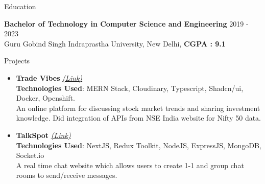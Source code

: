 \documentclass{resume} %
\begin{document}

\begin{rSection}{Education}

{\bf Bachelor of Technology in Computer Science and Engineering} \hfill {2019 - 2023}
\\ 
{\normalfont Guru Gobind Singh Indraprastha University, New Delhi}, \textbf{CGPA : 9.1}

\end{rSection}
 


\begin{rSection}{Projects}
   \begin{itemize}
    \item \textbf{Trade Vibes} 
    \href{https://github.com/tushargahlaut/TradeVibes}
    {\emph{(Link)}}
    \\ \textbf{Technologies Used}: MERN Stack, Cloudinary, Typescript, Shadcn/ui, Docker, Openshift.
     \\An online platform for discussing stock market trends and sharing investment knowledge. Did integration of APIs from NSE India website for Nifty 50 data.
    \item \textbf{TalkSpot} 
   \href{https://github.com/tushargahlaut/talkspot-chat-app}{\emph{(Link)}} 
   \\ \textbf{Technologies Used}: NextJS, Redux Toolkit, NodeJS, ExpressJS, MongoDB, Socket.io 
   \\{\normalfont A real time chat website which allows users to create 1-1 and group chat rooms to send/receive messages.}
   
   \end{itemize}
\end{rSection}
\end{document}
